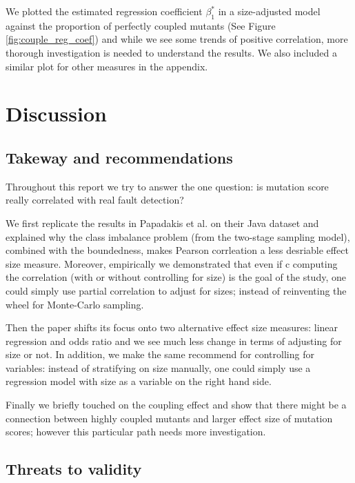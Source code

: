 \documentclass[10pt,letterpaper]{article}
\begin{document}
We plotted the estimated regression coefficient $\beta^*_1$ in a size-adjusted model against the proportion of perfectly coupled mutants (See Figure  \ref{fig:couple_reg_coef})  and while we see some trends of positive correlation, more thorough investigation is needed to understand the results. We also included a similar plot for other measures in the appendix. 
    

\section{Discussion}

\subsection{Takeway and recommendations}

Throughout this report we try to answer the one question: is mutation score really correlated with real fault detection? 

We first replicate the results in Papadakis et al. on their Java dataset and explained why the class imbalance problem (from the two-stage sampling model), combined with the boundedness, makes Pearson corrleation a less desriable effect size measure. Moreover, empirically we demonstrated that even if c computing the correlation (with or without controlling for size) is the goal of the study, one could simply use partial correlation to adjust for sizes; instead of reinventing the wheel for Monte-Carlo sampling.

Then the paper shifts its focus onto two alternative effect size measures: linear regression and odds ratio and we see much less change in terms of adjusting for size or not. In addition, we make the same recommend for controlling for variables: instead of stratifying on size manually, one could simply use a regression model with size as a variable on the right hand side. 

Finally we briefly touched on the coupling effect and show that there might be a connection between highly coupled mutants and larger effect size of mutation scores; however this particular path needs more investigation.


\subsection{Threats to validity}
\end{document}
